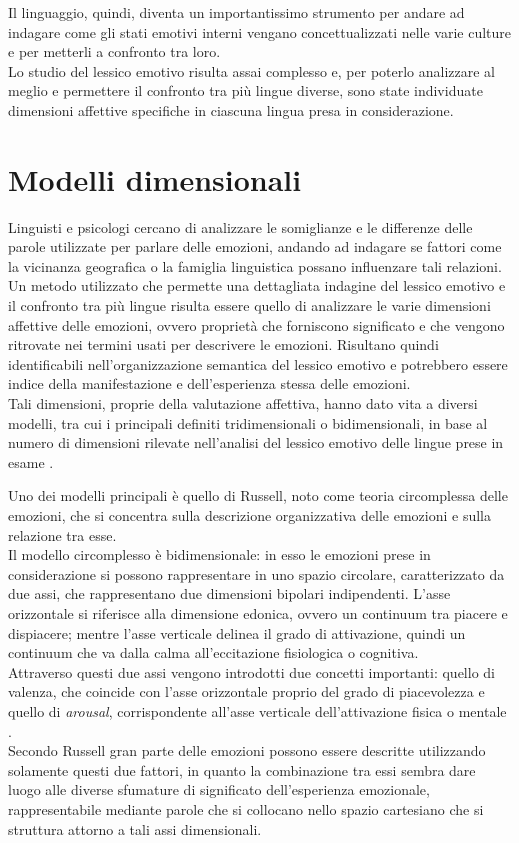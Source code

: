 Il linguaggio, quindi, diventa un importantissimo strumento per andare ad indagare come gli stati emotivi interni vengano concettualizzati nelle varie culture e per metterli a confronto tra loro. \\
Lo studio del lessico emotivo risulta assai complesso e, per poterlo analizzare al meglio e permettere il confronto tra più lingue diverse, sono state individuate dimensioni affettive specifiche in ciascuna lingua presa in considerazione. 

\section{Modelli dimensionali}
Linguisti e psicologi cercano di analizzare le somiglianze e le differenze delle parole utilizzate per parlare delle emozioni, andando ad indagare se fattori come la vicinanza geografica o la famiglia linguistica possano influenzare tali relazioni. \\
Un metodo utilizzato che permette una dettagliata indagine del lessico emotivo e il confronto tra più lingue risulta essere quello di analizzare le varie dimensioni affettive delle emozioni, ovvero proprietà che forniscono significato e che vengono ritrovate nei termini usati per descrivere le emozioni. Risultano quindi identificabili nell'organizzazione semantica del lessico emotivo e potrebbero essere indice della manifestazione e dell'esperienza stessa delle emozioni.\\
Tali dimensioni, proprie della valutazione affettiva, hanno dato vita a diversi modelli, tra cui i principali definiti tridimensionali o bidimensionali, in base al numero di dimensioni rilevate nell'analisi del lessico emotivo delle lingue prese in esame \parencite{model}. 

Uno dei modelli principali è quello di Russell, noto come teoria circomplessa delle emozioni, che si concentra sulla descrizione organizzativa delle emozioni e sulla relazione tra esse.\\
Il modello circomplesso è bidimensionale: in esso le emozioni prese in considerazione si possono rappresentare in uno spazio circolare, caratterizzato da due assi, che rappresentano due dimensioni bipolari indipendenti. L'asse orizzontale si riferisce alla dimensione edonica, ovvero un continuum tra piacere e dispiacere; mentre l'asse verticale delinea il grado di attivazione, quindi un continuum che va dalla calma all'eccitazione fisiologica o cognitiva.\\
Attraverso questi due assi vengono introdotti due concetti importanti: quello di valenza, che coincide con l'asse orizzontale proprio del grado di piacevolezza e quello di \textit{arousal}, corrispondente all'asse verticale dell'attivazione fisica o mentale \parencite{russell_circumplex}. \\
Secondo Russell gran parte delle emozioni possono essere descritte utilizzando solamente questi due fattori, in quanto la combinazione tra essi sembra dare luogo alle diverse sfumature di significato dell’esperienza emozionale, rappresentabile mediante parole che si collocano nello spazio cartesiano che si struttura attorno a tali assi dimensionali. 

